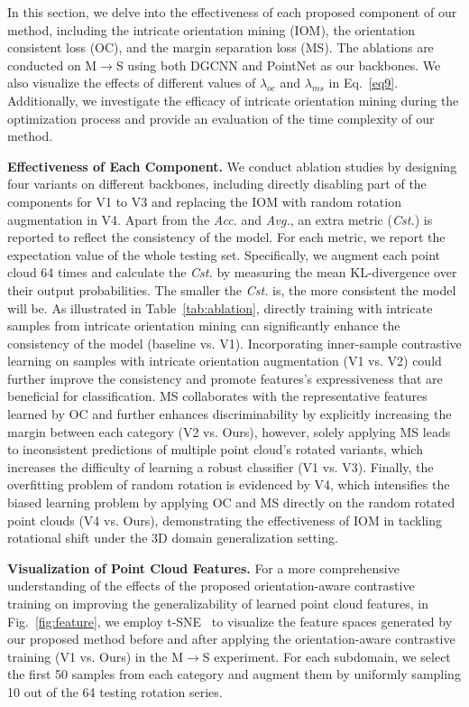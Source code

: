 In this section, we delve into the effectiveness of each proposed component of our method, including the intricate orientation mining (IOM), the orientation consistent loss (OC), and the margin separation loss (MS). The ablations are conducted on M$\to$S using both DGCNN and PointNet as our backbones. We also visualize the effects of different values of $\lambda_{oc}$ and $\lambda_{ms}$ in Eq.~\ref{eq9}. Additionally, we investigate the efficacy of intricate orientation mining during the optimization process and provide an evaluation of the time complexity of our method.


\noindent\textbf{Effectiveness of Each Component.} We conduct ablation studies by designing four variants on different backbones, including directly disabling part of the components for V1 to V3 and replacing the IOM with random rotation augmentation in V4. Apart from the \textit{Acc.} and \textit{Avg.}, an extra metric (\textit{Cst.}) is reported to reflect the consistency of the model. For each metric, we report the expectation value of the whole testing set. Specifically, we augment each point cloud 64 times and calculate the \textit{Cst.} by measuring the mean KL-divergence over their output probabilities. The smaller the \textit{Cst.} is, the more consistent the model will be. As illustrated in Table~\ref{tab:ablation}, directly training with intricate samples from intricate orientation mining can significantly enhance the consistency of the model (baseline vs. V1). Incorporating inner-sample contrastive learning on samples with intricate orientation augmentation (V1 vs. V2) could further improve the consistency and promote features's expressiveness that are beneficial for classification. MS collaborates with the representative features learned by OC and further enhances discriminability by explicitly increasing the margin between each category (V2 vs. Ours), however, solely applying MS leads to inconsistent predictions of multiple point cloud's rotated variants, which increases the difficulty of learning a robust classifier (V1 vs. V3). Finally, the overfitting problem of random rotation is evidenced by V4, which intensifies the biased learning problem by applying OC and MS directly on the random rotated point clouds (V4 vs. Ours), demonstrating the effectiveness of IOM in tackling rotational shift under the 3D domain generalization setting.


\noindent\textbf{Visualization of Point Cloud Features.} 
For a more comprehensive understanding of the effects of the proposed orientation-aware contrastive training on improving the generalizability of learned point cloud features, in Fig.~\ref{fig:feature}, we employ t-SNE~\cite{van2008visualizing} to visualize the feature spaces generated by our proposed method before and after applying the orientation-aware contrastive training (V1 vs. Ours) in the M$\to$S experiment. For each subdomain, we select the first 50 samples from each category and augment them by uniformly sampling 10 out of the 64 testing rotation series.



